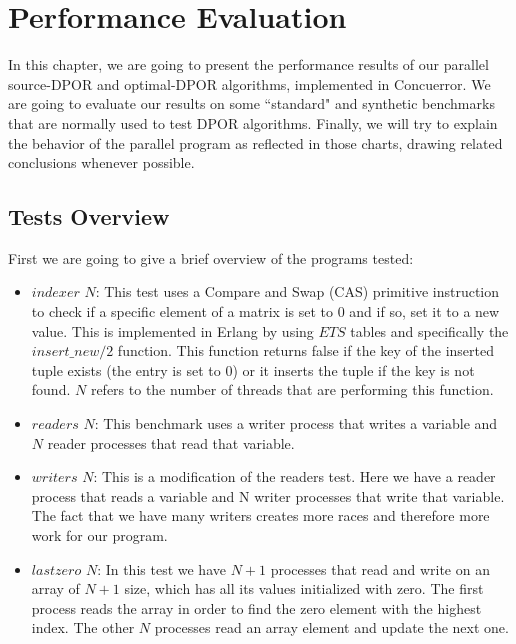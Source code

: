\chapter{Performance Evaluation}
\label{perfresults}

In this chapter, we are going to present the performance results of our parallel source-DPOR and optimal-DPOR algorithms,
implemented in Concuerror. We are going to evaluate our results on some ``standard" and synthetic benchmarks that are normally
used to test DPOR algorithms. Finally, we will try to explain the behavior of the parallel program as reflected in those
charts, drawing related conclusions whenever possible.

\section{Tests Overview}

First we are going to give a brief overview of the programs tested:

\begin{itemize}
    \item $indexer$ $N$: This test uses a Compare and Swap (CAS) primitive instruction to check if a specific element of
    a matrix is set to 0 and if so, set it to a new value. This is implemented in Erlang by using $ETS$ tables and specifically
    the $insert\_new/2$ function. This function returns false if the key of the inserted tuple exists (the entry is set to 0)
    or it inserts the tuple if the key is not found. $N$ refers to the number of threads that are performing this function.
    \item $readers$ $N$: This benchmark uses a writer process that writes a variable and $N$ reader processes that read that variable.
    \item $writers$ $N$: This is a modification of the readers test. Here we have a reader process that reads a variable and 
    N writer processes that write that variable. The fact that we have many writers creates more races and therefore more work
    for our program.
    \item $ lastzero$ $N$: In this test we have $N+1$ processes that read and write on an array of $N+1$ size, which has all its 
    values initialized with zero. The first process reads the array in order to find the zero element with the highest
    index. The other $N$ processes read an array element and update the next one.
\end{itemize}

